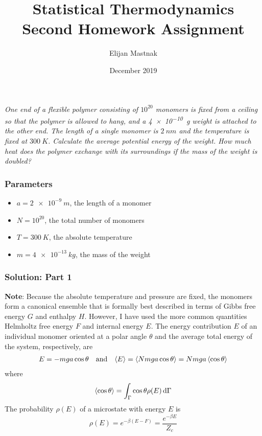 \documentclass[11pt, a4paper]{article}
\newcommand*\diff{\mathop{}\!\mathrm{d}} %
\begin{document}
	\title{Statistical Thermodynamics Second Homework Assignment}
	\author{Elijan Mastnak}
	\date{December 2019}
	\maketitle
	
\textit{One end of a flexible polymer consisting of $ 10^{20} $ monomers is fixed from a ceiling so that the polymer is allowed to hang, and a \SI{4e-10}{g} weight is attached to the other end. The length of a single monomer is $ \SI{2}{nm} $ and the temperature is fixed at $ \SI{300}{K} $. Calculate the average potential energy of the weight. How much heat does the polymer exchange with its surroundings if the mass of the weight is doubled?}
\subsubsection*{Parameters}
\begin{itemize}
	\item $ a = \SI{2e-9}{m} $, the length of a monomer
	\item $ N = 10^{20} $, the total number of monomers
	\item $ T = \SI{300}{K} $, the absolute temperature
	\item $ m = \SI{4e-13}{kg} $, the mass of the weight
\end{itemize}

\subsubsection*{Solution: Part 1}
\textbf{Note}: Because the absolute temperature and pressure are fixed, the monomers form a canonical ensemble that is formally best described in terms of Gibbs free energy $ G $ and enthalpy $ H $. However, I have used the more common quantities Helmholtz free energy $ F $ and internal energy $ E $. 
\newline
\newline
The energy contribution $ E $ of an individual monomer oriented at a polar angle $ \theta $ and the average total energy of the system, respectively, are
\begin{align*}
	E = -m g a \cos \theta 	&& \text{and} && \expval{E} = \expval{ N m g a \cos \theta } = N m g a \expval{\cos \theta} 
\end{align*}
where 
\begin{equation*}
	\expval{\cos \theta } = \int_{\Gamma} \cos \theta \rho (E) \diff \Gamma 
\end{equation*}
The probability $ \rho(E) $ of a microstate with energy $ E $ is
\begin{equation*}
	\rho(E) = e^{- \beta (E - F)} = \frac{e^{-\beta E}}{Z_c}
\end{equation*}
\end{document}
